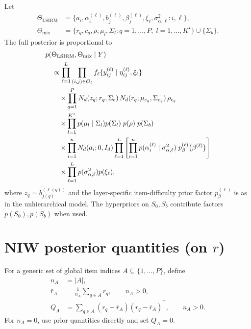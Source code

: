 \documentclass[11pt]{article}
\newcommand{\trans}{^{\mathsf T}}
\begin{document}
Let
\begin{align*}
    \Theta_{\mathrm{LSIRM}}
    &=\{a_i,\alpha_i^{(\ell)},b_j^{(\ell)},\beta_j^{(\ell)},\xi_\ell,
    \sigma_{\alpha,\ell}^2:i,\ell\},\\
    \Theta_{\mathrm{mix}}
    &=\{r_q,c_q,\rho,\mu_l,\Sigma_l:q=1,\dots,P,\;l=1,\dots,K^\star\}\cup\{\Sigma_b\}.
\end{align*}
The full posterior is proportional to
\begin{align}
&p(\Theta_{\mathrm{LSIRM}},\Theta_{\mathrm{mix}}\mid Y)
\notag\\
&\quad \propto
\prod_{\ell=1}^L
\prod_{(i,j)\in\mathcal O_\ell}
    f_\ell\{y_{ij}^{(\ell)}\mid \eta_{ij}^{(\ell)},\xi_\ell\}
\notag\\
&\qquad\times
\prod_{q=1}^P
    N_d(z_q;r_q,\Sigma_b)\,
    N_d(r_q;\mu_{c_q},\Sigma_{c_q})\,\rho_{c_q}
\notag\\
&\qquad\times
\prod_{l=1}^{K^\star}p(\mu_l\mid\Sigma_l)p(\Sigma_l)
\;p(\rho)\;p(\Sigma_b)
\notag\\
&\qquad\times
\prod_{i=1}^{n}N_d(a_i;0,I_d)
\prod_{\ell=1}^L
\left[
\prod_{i=1}^{n}p(\alpha_i^{(\ell)}\mid\sigma_{\alpha,\ell}^2)
\;p_\beta^{(\ell)}\bigl(\beta^{(\ell)}\bigr)
\right]
\notag\\
&\qquad\times
\prod_{\ell=1}^L p(\sigma_{\alpha,\ell}^2)p(\xi_\ell),
    \label{eq:full-posterior}
\end{align}
where $z_q=b_{j(q)}^{(\ell(q))}$ and the layer-specific item-difficulty prior
factor $p_\beta^{(\ell)}$ is as in the unhierarchical model.  The
hyperpriors on $S_0,S_b$ contribute factors $p(S_0),p(S_b)$ when used.

\section{NIW posterior quantities (on $r$)}

For a generic set of global item indices $A\subseteq\{1,\dots,P\}$, define
\begin{align}
    n_A &= |A|,\\
    \bar r_A &= \frac{1}{n_A}\sum_{q\in A}r_q,
    \qquad n_A>0,\\
    Q_A &= \sum_{q\in A}(r_q-\bar r_A)(r_q-\bar r_A)\trans,
    \qquad n_A>0.
\end{align}
For $n_A=0$, use prior quantities directly and set $Q_A=0$.
\end{document}
